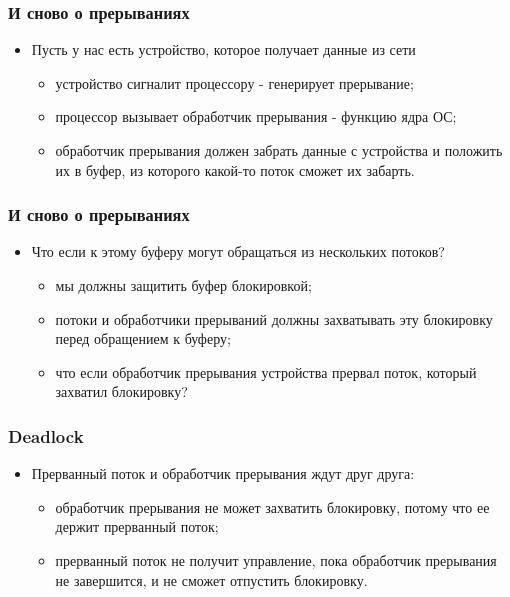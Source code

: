 \begin{frame}
\frametitle{И сново о прерываниях}
\begin{itemize}
    \item<1->Пусть у нас есть устройство, которое получает данные из сети
    \begin{itemize}
        \item<2->устройство сигналит процессору - генерирует прерывание;
        \item<3->процессор вызывает обработчик прерывания - функцию ядра ОС;
        \item<4->обработчик прерывания должен забрать данные с устройства и
             положить их в буфер, из которого какой-то поток сможет их забарть.
    \end{itemize}
\end{itemize}
\end{frame}

\begin{frame}
\frametitle{И сново о прерываниях}
\begin{itemize}
    \item<1->Что если к этому буферу могут обращаться из нескольких потоков?
    \begin{itemize}
        \item<2->мы должны защитить буфер блокировкой;
        \item<3->потоки и обработчики прерываний должны захватывать эту
             блокировку перед обращением к буферу;
        \item<4->что если обработчик прерывания устройства прервал поток,
             который захватил блокировку?
    \end{itemize}
\end{itemize}
\end{frame}

\begin{frame}
\frametitle{Deadlock}
\begin{itemize}
    \item<1->Прерванный поток и обработчик прерывания ждут друг друга:
    \begin{itemize}
        \item<2->обработчик прерывания не может захватить блокировку, потому
             что ее держит прерванный поток;
        \item<3->прерванный поток не получит управление, пока обработчик
             прерывания не завершится, и не сможет отпустить блокировку.
    \end{itemize}
\end{itemize}
\end{frame}

